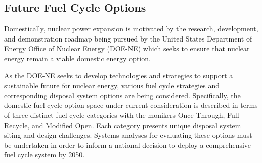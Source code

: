 


\subsection{Future Fuel Cycle Options}

Domestically, nuclear power expansion is motivated by the research, 
development, and demonstration roadmap being pursued by the United 
States Department of Energy Office of Nuclear Energy (DOE-NE) which 
seeks to ensure that nuclear energy remain a viable domestic energy 
option.  \cite{department_of_energy_-_nuclear_energy_nuclear_2010} 

As the DOE-NE seeks to develop technologies and strategies to support 
a sustainable future for nuclear energy, various fuel cycle strategies 
and corresponding disposal system options are being considered.  
Specifically, the domestic fuel cycle option space under current 
consideration is described in terms of three distinct fuel cycle 
categories with the monikers Once Through, Full Recycle, and Modified 
Open. Each category presents unique disposal system siting and design 
challenges. Systems analyses for evaluating these options must be 
undertaken in order to inform a national decision to deploy a 
comprehensive fuel cycle system by 2050.  
\cite{department_of_energy_-_nuclear_energy_nuclear_2010} 

